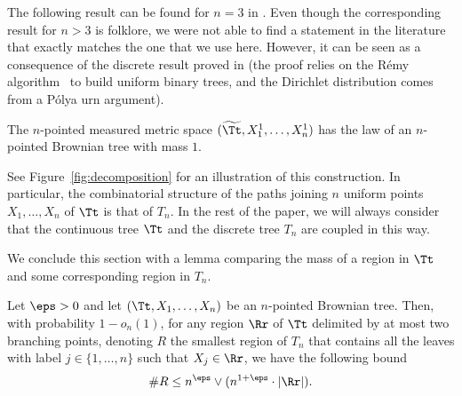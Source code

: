 The following result can be found for $n=3$ in \cite{aldous_recursive_1994}.
Even though the corresponding result for $n>3$ is folklore, we were not able to find a statement in the literature that exactly matches the one that we use here. However, it can be seen as a consequence of the discrete result proved in \cite[Ex.\,7.4.12 and Ex.\,7.4.13]{pitman_combinatorial_2006} (the proof relies on the Rémy algorithm~\cite{Rem85} to build uniform binary trees, and the Dirichlet distribution comes from a Pólya urn argument).
\begin{theorem}\label{thm_discrete_continuous_coupling}
The $n$-pointed measured metric space $( \widetilde{\Tt}, X_1^1, \dots, X_n^1)$ has the law of an $n$-pointed Brownian tree with mass $1$.
\end{theorem}
See Figure~\ref{fig:decomposition} for an illustration of this construction.
In particular, the combinatorial structure of the paths joining $n$ uniform points $X_1, \dots, X_n$ of $\Tt$ is that of $T_n$.
In the rest of the paper, we will always consider that the continuous tree $\Tt$ and the discrete tree $T_n$ are coupled in this way.

We conclude this section with a lemma comparing the mass of a region in $\Tt$ and some corresponding region in $T_n$.
\begin{lemma}\label{lem:comparison mass vs leaf-count}
Let $\eps>0$ and let $\left( \Tt, X_1, \dots, X_n \right)$ be an $n$-pointed Brownian tree.
Then, with probability $1 - o_n(1)$, for any region $\Rr$ of $\Tt$ delimited by at most two branching points,
denoting $R$ the smallest region of $T_n$ that contains all the leaves with label $j \in \{1,\dots,n\}$ such that $X_j \in \Rr$, we have the following bound
\begin{align*}
\#R \leq n^\eps \vee (n^{1+\eps} \cdot |\Rr|).
\end{align*}
\end{lemma}

